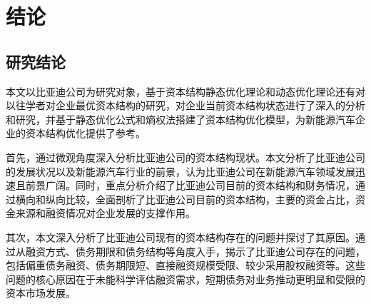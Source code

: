 \chapter{结论}
\section{研究结论}




本文以比亚迪公司为研究对象，基于资本结构静态优化理论和动态优化理论还有对以往学者对企业最优资本结构的研究，对企业当前资本结构状态进行了深入的分析和研究，并基于静态优化公式和熵权法搭建了资本结构优化模型，为新能源汽车企业的资本结构优化提供了参考。

首先，通过微观角度深入分析比亚迪公司的资本结构现状。本文分析了比亚迪公司的发展状况以及新能源汽车行业的前景，认为比亚迪公司在新能源汽车领域发展迅速且前景广阔。同时，重点分析介绍了比亚迪公司目前的资本结构和财务情况，通过横向和纵向比较，全面剖析了比亚迪公司目前的资本结构，主要的资金占比，资金来源和融资情况对企业发展的支撑作用。

其次，本文深入分析了比亚迪公司现有的资本结构存在的问题并探讨了其原因。通过从融资方式、债务期限和债务结构等角度入手，揭示了比亚迪公司存在的问题，包括偏重债务融资、债务期限短、直接融资规模受限、较少采用股权融资等。这些问题的核心原因在于未能科学评估融资需求，短期债务对业务推动更明显和受限的资本市场发展。

